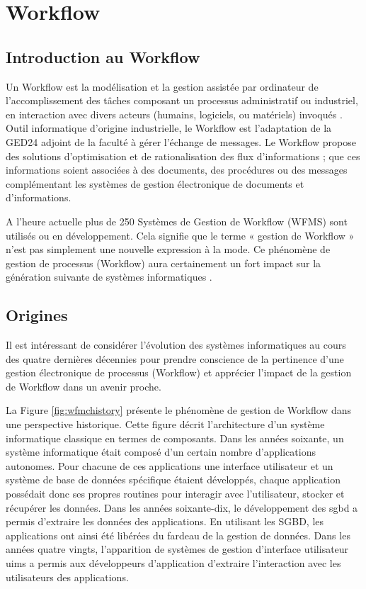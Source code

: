  
 

 \section{Workflow}
 	 
 	 \subsection{Introduction au Workflow }
 	 
 	 
 	 Un Workflow est la modélisation et la gestion assistée par ordinateur de l’accomplissement des tâches composant un processus administratif ou industriel, en interaction avec divers acteurs (humains, logiciels, ou matériels) invoqués \parencite{Courtois}.  Outil informatique d’origine industrielle, le Workflow est l’adaptation de la GED24 adjoint de la faculté à gérer l’échange de messages. Le Workflow propose des solutions d’optimisation et de rationalisation des flux d’informations ; que ces informations soient associées à des documents, des procédures ou des messages complémentant les systèmes de gestion électronique de documents et d’informations.
 	 
 	 A l’heure actuelle plus de 250 Systèmes de Gestion de Workflow (WFMS) sont utilisés ou en développement. Cela signifie que le terme « gestion de Workflow » n’est pas simplement une nouvelle expression à la mode. Ce phénomène de gestion de processus (Workflow) aura certainement un fort impact sur la génération suivante de systèmes informatiques \parencite{Courtois}. 
 	 
 \subsection{Origines} 
 	 Il est intéressant de considérer l’évolution des systèmes informatiques au cours des quatre dernières décennies \parencite{VanderAalst} pour prendre conscience de la pertinence d’une gestion électronique de processus (Workflow) et apprécier l’impact de la gestion de Workflow dans un avenir proche.
 	 
 	  La Figure \ref{fig:wfmchistory} présente le phénomène de gestion de Workflow dans une perspective historique. Cette figure décrit l’architecture d’un système informatique classique en termes de composants. Dans les années soixante, un système informatique était composé d’un certain nombre d’applications autonomes. Pour chacune de ces applications une interface utilisateur et un système de base de données spécifique étaient développés, chaque application possédait donc ses propres routines pour interagir avec l’utilisateur, stocker et récupérer les données. Dans les années soixante-dix, le développement des \ac{sgbd} a permis d’extraire les données des applications. En utilisant les SGBD, les applications ont ainsi été libérées du fardeau de la gestion de données. Dans les années quatre vingts, l’apparition de systèmes de gestion d’interface utilisateur \ac{uims} a permis aux développeurs d’application d’extraire l’interaction avec les utilisateurs des applications.
 	  
